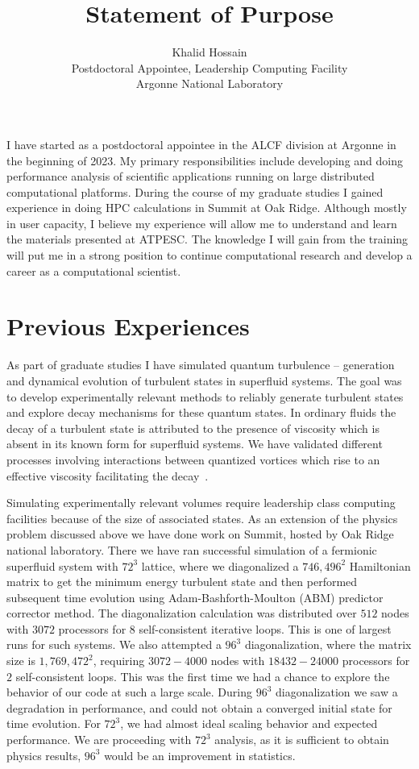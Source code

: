 \documentclass{article}
\title{Statement of Purpose}
\author{Khalid Hossain \\
        Postdoctoral Appointee, Leadership Computing Facility \\
        Argonne National Laboratory}
\date{}
\begin{document}
\maketitle

I have started as a postdoctoral appointee in the ALCF division at Argonne in 
the beginning of 2023. My primary responsibilities include developing and 
doing performance 
analysis of scientific applications running on large distributed computational
platforms. During the course of my graduate studies I gained experience in 
doing HPC calculations in Summit at Oak Ridge. Although mostly in user 
capacity, I believe my experience will allow me to understand and learn the 
materials presented at ATPESC. The knowledge I will gain from the training will
put me in a strong position to continue computational research and develop a
career as a computational scientist.

\section*{Previous Experiences}

As part of graduate studies I have simulated quantum turbulence -- generation and
dynamical evolution of turbulent states in superfluid systems. The goal was to
develop experimentally relevant methods to reliably generate turbulent states
and explore decay mechanisms for these quantum states. In ordinary fluids the
decay of a turbulent state is attributed to the presence of viscosity which is
absent in its known form for superfluid systems. We have validated different 
processes involving interactions between quantized vortices which rise to an
effective viscosity facilitating the decay~\cite{Hossain:2022}.

Simulating experimentally relevant volumes require leadership class computing
facilities because of the size of associated states. As an extension of the 
physics problem discussed above we have done work on Summit, hosted by Oak Ridge
national laboratory. There we have ran successful simulation of a fermionic
superfluid system with $72^3$ lattice, where we diagonalized a $746,496^2$ 
Hamiltonian matrix to get the minimum energy turbulent state and then performed
subsequent time evolution using Adam-Bashforth-Moulton (ABM) predictor 
corrector method. The diagonalization calculation was distributed over $512$ 
nodes with $3072$ processors for $8$ self-consistent iterative loops. This is 
one of largest runs for such systems. We
also attempted a $96^3$ diagonalization, where the matrix size is $1,769,472^2$,
requiring $3072 - 4000$ nodes with $18432 - 24000$ processors for $2$ 
self-consistent loops. This was the first time we had a chance to explore the 
behavior of our code at such a large scale. During $96^3$ diagonalization we 
saw a degradation in performance, and could not obtain a converged initial state
for time evolution. For $72^3$, we had almost ideal scaling behavior and 
expected performance. We are proceeding with $72^3$ analysis, as it is sufficient 
to obtain physics results, $96^3$ would be an improvement in statistics.
\end{document}
